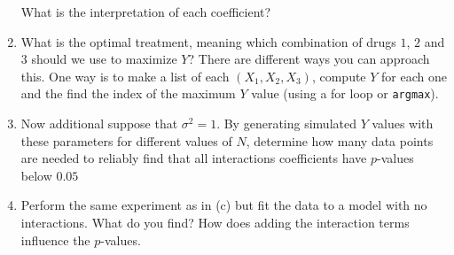 \begin{exercise}
\begin{enumerate}[label=(\alph*)]
What is the interpretation of each coefficient? 
\item 
What is the optimal treatment, meaning which combination of drugs $1$, $2$ and $3$ should we use to maximize $Y$? There are different ways you can approach this. One way is to make a list of each $(X_1,X_2,X_3)$, compute $Y$ for each one and the find the index of the maximum $Y$ value (using a for loop or \verb!argmax!). 
\item Now additional suppose that $\sigma^2 = 1$. 
By generating simulated $Y$ values with these parameters for different values of $N$, determine how many data points are needed to reliably find that all interactions coefficients have $p$-values below $0.05$
\item Perform the same experiment as in (c) but fit the data to a model with no interactions. What do you find? How does adding the interaction terms influence the $p$-values. 
\end{enumerate}
\end{exercise}








 






